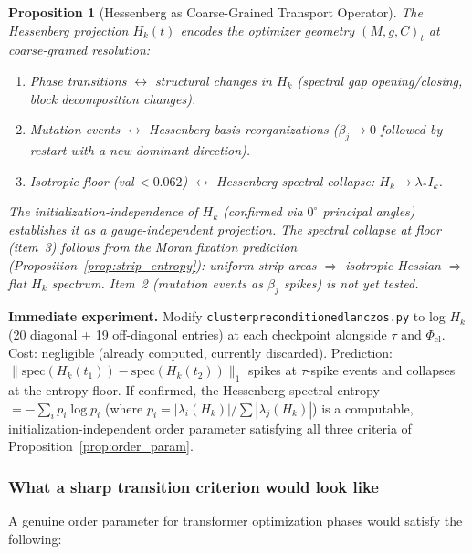 \documentclass[11pt]{amsart}
\newtheorem{proposition}[theorem]{Proposition}
\begin{document}
\begin{proposition}[Hessenberg as Coarse-Grained Transport Operator]
\label{prop:hessenberg}
The Hessenberg projection $H_k(t)$ encodes the optimizer geometry
$(M, g, C)_t$ at coarse-grained resolution:
\begin{enumerate}
\item Phase transitions $\leftrightarrow$ structural changes in $H_k$
  (spectral gap opening/closing, block decomposition changes).
\item Mutation events $\leftrightarrow$ Hessenberg basis reorganizations
  ($\beta_j \to 0$ followed by restart with a new dominant direction).
\item Isotropic floor (val\,$<0.062$) $\leftrightarrow$ Hessenberg
  spectral collapse: $H_k \to \lambda_* I_k$.
\end{enumerate}
The initialization-independence of $H_k$ (confirmed via $0^\circ$
principal angles) establishes it as a gauge-independent projection.
The spectral collapse at floor (item~3) follows from the Moran
fixation prediction (Proposition~\ref{prop:strip_entropy}): uniform
strip areas $\Rightarrow$ isotropic Hessian $\Rightarrow$ flat
$H_k$ spectrum.
Item~2 (mutation events as $\beta_j$ spikes) is not yet tested.
\end{proposition}

\textbf{Immediate experiment.}
Modify \texttt{cluster\discretionary{\_}{}{\_}preconditioned\discretionary{\_}{}{\_}lanczos.py}
to log $H_k$ (20 diagonal + 19 off-diagonal entries) at each
checkpoint alongside $\tau$ and $\Phi_\mathrm{cl}$.
Cost: negligible (already computed, currently discarded).
Prediction: $\|\mathrm{spec}(H_k(t_1)) - \mathrm{spec}(H_k(t_2))\|_1$
spikes at $\tau$-spike events and collapses at the entropy floor.
If confirmed, the Hessenberg spectral entropy
$= -\sum_i p_i \log p_i$
(where $p_i = |\lambda_i(H_k)|/\sum|\lambda_j(H_k)|$)
is a computable, initialization-independent order parameter
satisfying all three criteria of Proposition~\ref{prop:order_param}.

\subsubsection*{What a sharp transition criterion would look like}

A genuine order parameter for transformer optimization phases would
satisfy the following:
\end{document}
